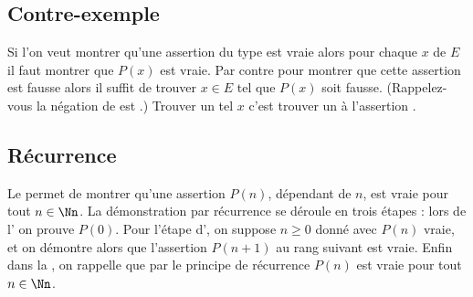 \documentclass[11pt,class=report,crop=false]{standalone}
\begin{document}
\subsection{Contre-exemple}

Si l'on veut montrer qu'une assertion du type  est vraie
alors pour chaque $x$ de $E$ il faut montrer que $P(x)$ est vraie. Par contre
pour montrer que cette assertion est fausse alors il suffit de trouver $x \in E$ tel que $P(x)$
 soit fausse. (Rappelez-vous la négation de 
est .)
Trouver un tel $x$ c'est trouver un  à l'assertion .



\subsection{Récurrence}

Le  permet de montrer qu'une assertion $P(n)$, dépendant de $n$,
est vraie pour tout $n \in \Nn$.
La démonstration par récurrence se déroule en trois étapes : lors de l' on prouve $P(0)$.
Pour l'étape d', on suppose $n\ge 0$ donné avec $P(n)$ vraie,
et on démontre alors que l'assertion  $P(n+1)$ au rang suivant est vraie.
Enfin dans la , on rappelle que par le principe de récurrence $P(n)$ est vraie pour tout $n\in\Nn$.


\finchapitre
\end{document}
